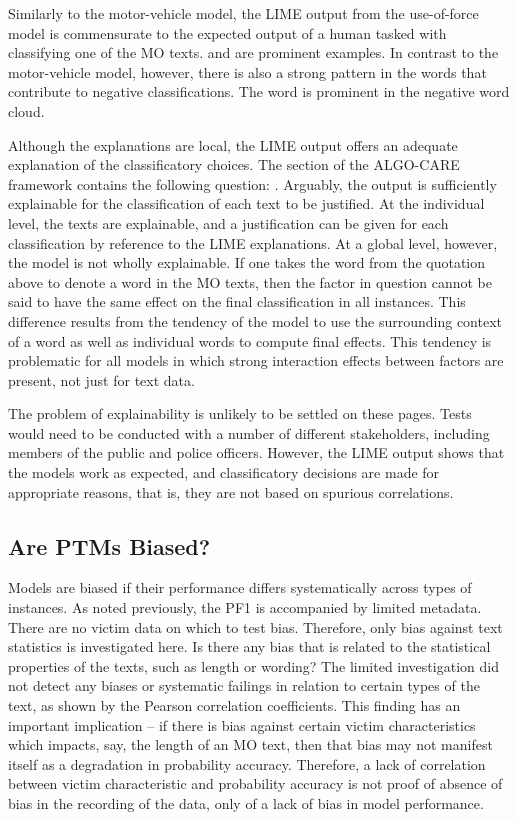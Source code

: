 Similarly to the motor-vehicle model, the LIME output from the use-of-force model is commensurate to the expected output of a human tasked with classifying one of the MO texts.  and  are prominent examples. In contrast to the motor-vehicle model, however, there is also a strong pattern in the words that contribute to negative classifications. The word  is prominent in the negative word cloud.

Although the explanations are local, the LIME output offers an adequate explanation of the classificatory choices. The  section of the ALGO-CARE framework contains the following question: . Arguably, the output is sufficiently explainable for the classification of each text to be justified. At the individual level, the texts are explainable, and a justification can be given for each classification by reference to the LIME explanations. At a global level, however, the model is not wholly explainable. If one takes the word  from the quotation above to denote a word in the MO texts, then the factor in question cannot be said to have the same effect on the final classification in all instances. This difference results from the tendency of the model to use the surrounding context of a word as well as individual words to compute final effects. This tendency is problematic for all models in which strong interaction effects between factors are present, not just for text data.

The problem of explainability is unlikely to be settled on these pages. Tests would need to be conducted with a number of different stakeholders, including members of the public and police officers. However, the LIME output shows that the models work as expected, and classificatory decisions are made for appropriate reasons, that is, they are not based on spurious correlations.


\subsection{Are PTMs Biased?} Models are biased if their performance differs systematically across types of instances. As noted previously, the PF1 is accompanied by limited metadata. There are no victim data on which to test bias. Therefore, only bias against text statistics is investigated here. Is there any bias that is related to the statistical properties of the texts, such as length or wording? The limited investigation did not detect any biases or systematic failings in relation to certain types of the text, as shown by the Pearson correlation coefficients. This finding has an important implication – if there is bias against certain victim characteristics which impacts, say, the length of an MO text, then that bias may not manifest itself as a degradation in probability accuracy. Therefore, a lack of correlation between victim characteristic and probability accuracy is not proof of absence of bias in the recording of the data, only of a lack of bias in model performance.



